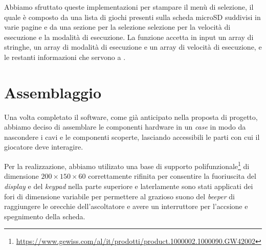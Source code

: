 \documentclass[a4paper]{article}
\begin{document}
Abbiamo sfruttato queste implementazioni per stampare il menù di selezione, il quale è composto da una lista di giochi presenti sulla scheda microSD suddivisi in varie pagine e da una sezione per la selezione selezione per la velocità di esecuzione e la modalità di esecuzione. La funzione accetta in input un array di stringhe, un array di modalità di esecuzione e un array di velocità di esecuzione, e le restanti informazioni che servono a {}.

\section{Assemblaggio}

Una volta completato il software, come già anticipato nella proposta di progetto, abbiamo deciso di assemblare le componenti hardware in un \textit{case} in modo da nascondere i cavi e le componenti scoperte, lasciando accessibili le parti con cui il giocatore deve interagire.

Per la realizzazione, abbiamo utilizato una base di supporto polifunzionale\footnote{\url{https://www.gewiss.com/al/it/prodotti/product.1000002.1000090.GW42002}} di dimensione $200 \times 150 \times 60$ correttamente rifinita per consentire la fuoriuscita del \textit{display} e del \textit{keypad} nella parte superiore e laterlamente sono stati applicati dei fori di dimensione variabile per permettere al grazioso suono del \textit{beeper} di raggiungere le orecchie dell'ascoltatore e avere un interruttore per l'accsione e spegnimento della scheda.
\end{document}
